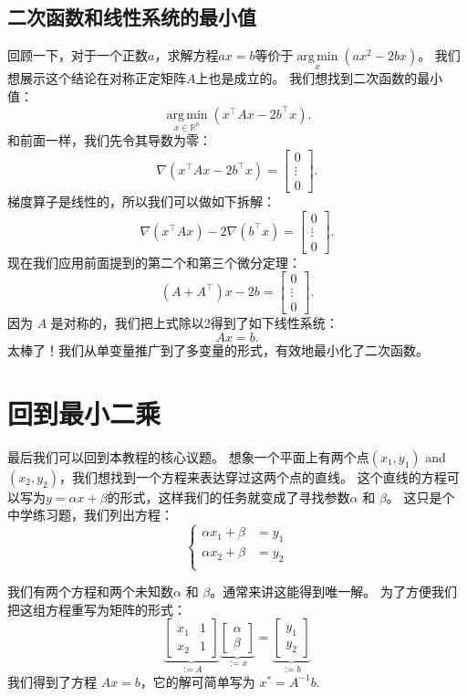 \documentclass[notitlepage,oneside]{book}
\DeclareMathOperator*{\argmin}{arg\,min}
\begin{document}
\subsection{二次函数和线性系统的最小值}
回顾一下，对于一个正数$a$，求解方程$ax=b$等价于$\argmin\limits_x(ax^2 - 2bx)$。
我们想展示这个结论在对称正定矩阵$A$上也是成立的。
我们想找到二次函数的最小值：
$$\argmin\limits_{x\in\mathbb R^n} (x^\top A x - 2b^\top x).$$
和前面一样，我们先令其导数为零：
$$\nabla (x^\top A x - 2b^\top x) = \begin{bmatrix}0 \\ \vdots \\ 0 \end{bmatrix}.$$
梯度算子是线性的，所以我们可以做如下拆解：
$$\nabla (x^\top A x) - 2\nabla(b^\top x) = \begin{bmatrix}0 \\ \vdots \\ 0 \end{bmatrix}.$$
现在我们应用前面提到的第二个和第三个微分定理：
$$(A+A^\top)x - 2b = \begin{bmatrix}0 \\ \vdots \\ 0 \end{bmatrix}.$$
因为 $A$ 是对称的，我们把上式除以2得到了如下线性系统：
$$Ax = b.$$
太棒了！我们从单变量推广到了多变量的形式，有效地最小化了二次函数。


\section{回到最小二乘}
最后我们可以回到本教程的核心议题。
想象一个平面上有两个点$(x_1, y_1)$ and $(x_2, y_2)$，我们想找到一个方程来表达穿过这两个点的直线。
这个直线的方程可以写为$y = \alpha x + \beta$的形式，这样我们的任务就变成了寻找参数$\alpha$ 和 $\beta$。
这只是个中学练习题，我们列出方程：
$$
\left\{
\begin{split}
\alpha x_1 + \beta &= y_1\\
\alpha x_2 + \beta &= y_2\\
\end{split}
\right.
$$

我们有两个方程和两个未知数$\alpha$ 和 $\beta$。通常来讲这能得到唯一解。
为了方便我们把这组方程重写为矩阵的形式：
$$
\underbrace{\begin{bmatrix}x_1  & 1 \\ x_2 & 1 \end{bmatrix}}_{:=A} 
\underbrace{\begin{bmatrix} \alpha \\ \beta \end{bmatrix}}_{:=x} = \underbrace{\begin{bmatrix} y_1 \\ y_2 \end{bmatrix}}_{:=b}
$$
我们得到了方程 $Ax = b$，它的解可简单写为 $x^* = A^{-1}b$.
\end{document}
